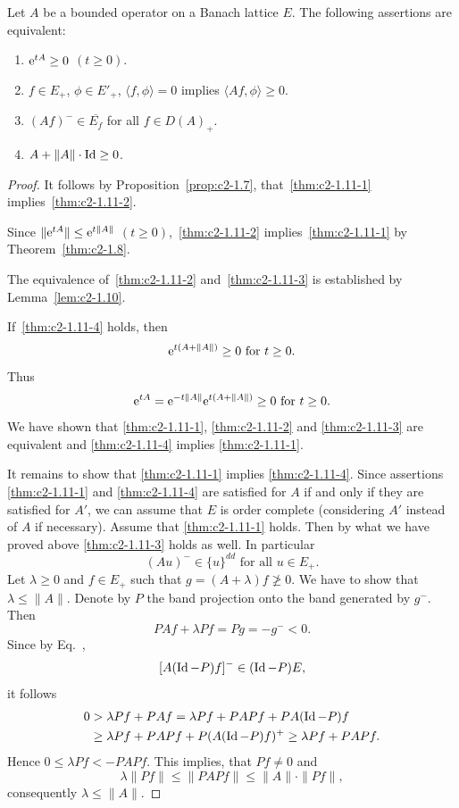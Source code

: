 \begin{theorem}\label{thm:c2-1.11}
%
Let $A$ be a bounded operator on a Banach lattice $E$.
The following assertions are equivalent:
\begin{enumerate}[\upshape (a)] 
\item \label{thm:c2-1.11-1}
$\eu^{tA} \geq 0$ $(t \geq 0)$.
\item \label{thm:c2-1.11-2}
$f \in E_{+}$, $\phi \in E'_{+}$, $\langle f,\phi \rangle = 0$ implies $\langle Af,\phi \rangle \geq 0$.
\item \label{thm:c2-1.11-3}
$(Af)^{-} \in \overline{E_{f}}$ for all $f \in D(A)_{+}$.
\item \label{thm:c2-1.11-4}
$A + \|A\| \cdot \Id \geq 0$.
\end{enumerate}
\end{theorem}
\begin{proof}
It follows by Proposition~\ref{prop:c2-1.7},  that~\ref{thm:c2-1.11-1}   implies~\ref{thm:c2-1.11-2}.

Since $\|\eu^{tA}\| \leq \eu^{t\|A\|}$ $(t\geq0)$,~\ref{thm:c2-1.11-2}   implies~\ref{thm:c2-1.11-1}   by Theorem~\ref{thm:c2-1.8}.

The equivalence of~\ref{thm:c2-1.11-2}   and~\ref{thm:c2-1.11-3}   is established by Lemma~\ref{lem:c2-1.10}.

If~\ref{thm:c2-1.11-4} holds, then 
\[
\eu^{t(A+\|A\|)} \geq 0 \text{ for } t\geq 0 .
\]
Thus 
\[
\eu^{tA} = \eu^{-t\|A\|} \eu^{t(A+\|A\|)} \geq 0 \text{ for } t\geq 0 .
\]
We have shown that \ref{thm:c2-1.11-1}, \ref{thm:c2-1.11-2}  and \ref{thm:c2-1.11-3} are equivalent and \ref{thm:c2-1.11-4}  implies \ref{thm:c2-1.11-1}.

It remains to show that \ref{thm:c2-1.11-1}  implies \ref{thm:c2-1.11-4}.
Since assertions \ref{thm:c2-1.11-1}   and \ref{thm:c2-1.11-4}  are satisfied for $A$ if and only if they are satisfied for $A'$, we can assume that $E$ is order complete (considering $A'$ instead of\/ $A$ if necessary).
Assume that \ref{thm:c2-1.11-1}   holds.
Then by what we have proved above \ref{thm:c2-1.11-3}   holds as well.
In particular
\begin{equation}\label{eq:c2-1.9}
(Au)^{-} \in \{u\}^{dd} \text{ for all } u \in E_{+}.
\end{equation}
Let $\lambda \geq 0$ and $f \in E_{+}$ such that $g = (A + \lambda)f \not\geq 0$.
We have to show that $\lambda \leq \|A\|$.
Denote by $P$ the band projection onto the band generated by $g^{-}$.
Then 
\[
PAf + \lambda Pf = Pg = -g^{-} < 0 .
\]
Since by  Eq.~, 
\[
[A(\operatorname{Id} - P)f]^{-} \in (\operatorname{Id} - P)E ,
\]
it follows 
\begin{equation*}
    \begin{split}
    0 &> \lambda Pf + PAf = \lambda Pf + PAPf + PA(\Id-P)f \\
    &\geq \lambda Pf + PAPf + P(A(\Id-P)f)^{+} \geq \lambda Pf + PAPf .
    \end{split}
\end{equation*}
Hence $0 \leq \lambda Pf < -PAPf$.
This implies, that $Pf \neq 0$ and 
%
\[
	\lambda\|Pf\| \leq \|PAPf\| \leq \|A\|\cdot\|Pf\| ,
\]
%
consequently $\lambda \leq \|A\|$.
\end{proof}
